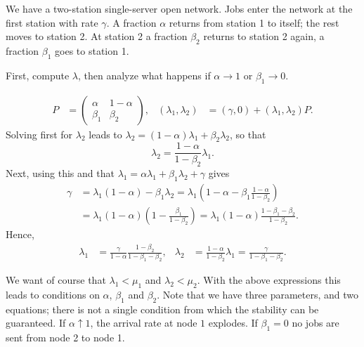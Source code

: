 \begin{exercise}\label{ex:47}
We have a two-station single-server open network.
Jobs enter the network at the first station with rate $\gamma$.
A fraction $\alpha$ returns from station 1 to itself; the rest moves to station 2.
At station 2 a fraction $\beta_2$ returns to station 2 again, a fraction $\beta_1$ goes to station 1.

First, compute $\lambda$, then analyze what happens if $\alpha\to 1$ or $\beta_1\to 0$.
\begin{solution}
 \begin{align*}
 P &=
 \begin{pmatrix}
 \alpha & 1- \alpha \\
 \beta_1 & \beta_2
 \end{pmatrix},
&
 (\lambda_1, \lambda_2) &= (\gamma, 0) + (\lambda_1, \lambda_2) P.
 \end{align*}
 Solving first for $\lambda_2$ leads to $\lambda_2 = (1-\alpha) \lambda_1 + \beta_2 \lambda_2$, so that
\begin{equation*}
 \lambda_2 = \frac{1-\alpha}{1-\beta_2} \lambda_1.
\end{equation*}
Next, using this and that $\lambda_1 = \alpha \lambda_1 + \beta_1 \lambda_2 + \gamma$ gives
\begin{equation*}
 \begin{split}
\gamma
&= \lambda_1(1-\alpha) - \beta_1\lambda_2
= \lambda_1\left(1-\alpha - \beta_1\frac{1-\alpha}{1-\beta_2}\right) \\
&= \lambda_1(1-\alpha)\left(1 - \frac{\beta_1 }{1-\beta_2}\right)
= \lambda_1(1-\alpha)\frac{1-\beta_1-\beta_2 }{1-\beta_2}.
 \end{split}
\end{equation*}
Hence,
\begin{align*}
 \lambda_1 &= \frac\gamma{1-\alpha}\frac{1-\beta_2}{1-\beta_1-\beta_2},&
 \lambda_2 &= \frac{1-\alpha}{1-\beta_2} \lambda_1 = \frac\gamma{1-\beta_1-\beta_2}.
\end{align*}

We want of course that $\lambda_1 < \mu_1$ and $\lambda_2 < \mu_2$.
With the above expressions this leads to conditions on $\alpha$, $\beta_1$ and $\beta_2$.
Note that we have three parameters, and two equations; there is not a single condition from which the stability can be guaranteed.
If $\alpha\uparrow 1$, the arrival rate at node $1$ explodes.
If $\beta_1=0$ no jobs are sent from node 2 to node 1.
\end{solution}
\end{exercise}


